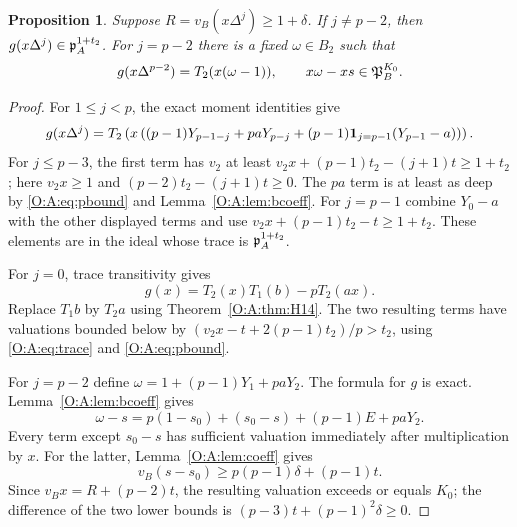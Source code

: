 \documentclass[11pt]{amsart}
\newtheorem{proposition}[theorem]{Proposition}
\theoremstyle{definition}
\theoremstyle{remark}
\begin{document}
\begin{proposition}\label{O:A:prop:g}
Suppose $R=v_B(x\Delta^j)\ge1+\delta$.
If $j\ne p-2$, then $g(x\Delta^j)\in\mathfrak p_A^{1+t_2}$.
For $j=p-2$ there is a fixed $\omega\in B_2$ such that
\[
 g(x\Delta^{p-2})=T_2(x(\omega-1)),\qquad
 x\omega-xs\in\mathfrak P_B^{K_0}.
\]
\end{proposition}
\begin{proof}
For $1\le j<p$, the exact moment identities give
\[
 g(x\Delta^j)=T_2\left(x\left((p-1)Y_{p-1-j}+paY_{p-j}
              +(p-1)\mathbf1_{j=p-1}(Y_{p-1}-a)\right)\right).
\]
For $j\le p-3$, the first term has $v_2$ at least
$v_2x+(p-1)t_2-(j+1)t\ge1+t_2$; here $v_2x\ge1$ and
$(p-2)t_2-(j+1)t\ge0$.
The $pa$ term is at least as deep by \eqref{O:A:eq:pbound} and
Lemma~\ref{O:A:lem:bcoeff}.
For $j=p-1$ combine $Y_0-a$ with the other displayed terms and use
$v_2x+(p-1)t_2-t\ge1+t_2$.
These elements are in the ideal whose trace is $\mathfrak p_A^{1+t_2}$.

For $j=0$, trace transitivity gives
\[
 g(x)=T_2(x)T_1(b)-pT_2(ax).
\]
Replace $T_1b$ by $T_2a$ using Theorem~\ref{O:A:thm:H14}.
The two resulting terms have valuations bounded below by
$(v_2x-t+2(p-1)t_2)/p>t_2$, using \eqref{O:A:eq:trace} and \eqref{O:A:eq:pbound}.

For $j=p-2$ define
$\omega=1+(p-1)Y_1+paY_2$.
The formula for $g$ is exact.  Lemma~\ref{O:A:lem:bcoeff} gives
\[
 \omega-s=p(1-s_0)+(s_0-s)+(p-1)E+paY_2.
\]
Every term except $s_0-s$ has sufficient valuation immediately after
multiplication by $x$.  For the latter, Lemma~\ref{O:A:lem:coeff} gives
\[
 v_B(s-s_0)\ge p(p-1)\delta+(p-1)t.
\]
Since $v_Bx=R+(p-2)t$, the resulting valuation exceeds or equals $K_0$;
the difference of the two lower bounds is
$(p-3)t+(p-1)^2\delta\ge0$.
\end{proof}
\end{document}
